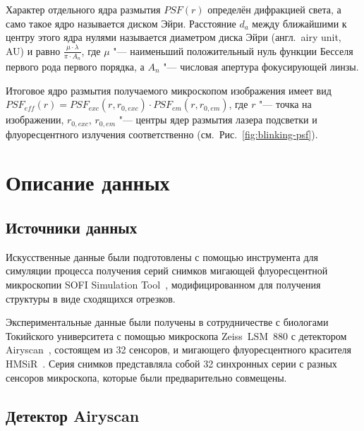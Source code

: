 Характер отдельного ядра размытия $PSF\left(r\right)$ определён дифракцией света, а само такое ядро называется диском Эйри. Расстояние $d_a$ между ближайшими к центру этого ядра нулями называется диаметром диска Эйри (англ.~airy unit, AU) и равно $\frac{\mu\cdot \lambda}{\pi \cdot A_n}$, где $\mu$ "--- наименьший положительный нуль функции Бесселя первого рода первого порядка, а $A_n$ "--- числовая апертура фокусирующей линзы.

Итоговое ядро размытия получаемого микроскопом изображения имеет вид $PSF_{eff}\left(r\right)=PSF_{exc}\left(r,r_{0,exc}\right)\cdot PSF_{em}\left(r,r_{0,em}\right)$, где $r$ "--- точка на изображении, $r_{0,exc}$, $r_{0,em}$ "--- центры ядер размытия лазера подсветки и флуоресцентного излучения соответственно (см.~Рис.~\ref{fig:blinking-psf}).

\section{Описание данных}

\subsection{Источники данных}

Искусственные данные были подготовлены с помощью инструмента для симуляции процесса получения серий снимков мигающей флуоресцентной микроскопии SOFI Simulation Tool~\cite{10.1371/journal.pone.0161602}, модифицированном для получения структуры в виде сходящихся отрезков.

Экспериментальные данные были получены в сотрудничестве с биологами Токийского университета с помощью микроскопа Zeiss~LSM~880 с детектором Airyscan~\cite{weisshart2014basic}, состоящем из 32 сенсоров, и мигающего флуоресцентного красителя HMSiR~\cite{uno2014spontaneously}. Серия снимков представляла собой 32 синхронных серии с разных сенсоров микроскопа, которые были предварительно совмещены.

\subsection{Детектор Airyscan}



